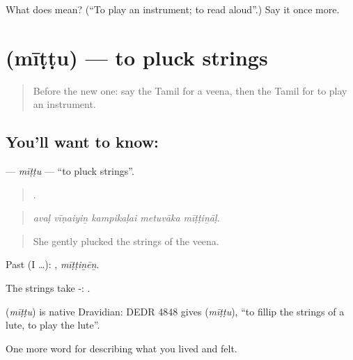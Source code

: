 \begin{tcolorbox}[breakable,colback=teal!4,colframe=teal!35!black,title={Before you move on}]
What does  mean? (\textquotedblleft{}To play an instrument; to read aloud\textquotedblright{}.) Say it once more.
\end{tcolorbox}
\section[\texorpdfstring{\ta{மீட்டு} (mīṭṭu)}{மீட்டு (mīṭṭu)}]{ (mīṭṭu) — to pluck strings}

\label{lesson:TA-C539-mittu}



\begin{quote}
Before the new one: say the Tamil for a veena, then the Tamil for to play an instrument.
\end{quote}

\subsection*{You'll want to know: }
\textbf{} — \emph{mīṭṭu} — \textquotedblleft{}to pluck strings\textquotedblright{}.

\begin{quote}
    .
\end{quote}

\begin{quote}
\emph{avaḷ vīṇaiyiṉ kampikaḷai metuvāka mīṭṭiṉāḷ.}
\end{quote}

\begin{quote}
She gently plucked the strings of the veena.
\end{quote}

Past (I …): , \emph{mīṭṭiṉēṉ}.

The strings take -:  .

\begin{cousinweb}
\textbf{} (\emph{mīṭṭu}) is native Dravidian: DEDR 4848 gives  (\emph{mīṭṭu}), \textquotedblleft{}to fillip the strings of a lute, to play the lute\textquotedblright{}.
\end{cousinweb}

\begin{grammarlens}[title={What you've built}]
One more word for describing what you lived and felt.
\end{grammarlens}

